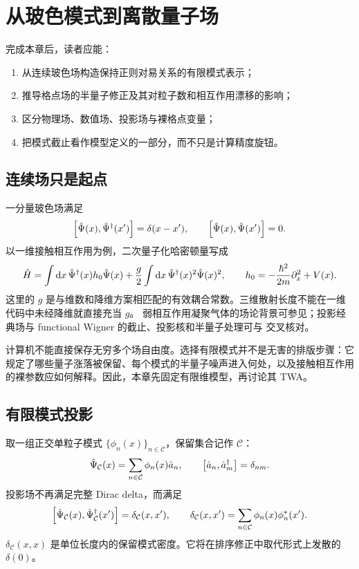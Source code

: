 \chapter{从玻色模式到离散量子场}
\label{ch:bose-field}

\begin{learningobjectives}
完成本章后，读者应能：
\begin{enumerate}
  \item 从连续玻色场构造保持正则对易关系的有限模式表示；
  \item 推导格点场的半量子修正及其对粒子数和相互作用漂移的影响；
  \item 区分物理场、数值场、投影场与裸格点变量；
  \item 把模式截止看作模型定义的一部分，而不只是计算精度旋钮。
\end{enumerate}
\end{learningobjectives}

\section{连续场只是起点}

一分量玻色场满足
\begin{equation}
  \left[\hat{\Psi}(x),\hat{\Psi}^{\dagger}(x')\right]=\delta(x-x'),
  \qquad
  \left[\hat{\Psi}(x),\hat{\Psi}(x')\right]=0 .
  \label{eq:continuous-commutator}
\end{equation}
以一维接触相互作用为例，二次量子化哈密顿量写成
\begin{equation}
  \hat H=\int\mathop{}\!\mathrm{d} x\,\hat{\Psi}^{\dagger}(x)h_0\hat{\Psi}(x)
  +\frac{g}{2}\int\mathop{}\!\mathrm{d} x\,\hat{\Psi}^{\dagger}(x)^2\hat{\Psi}(x)^2,
  \qquad
  h_0=-\frac{\hbar^2}{2m}\partial_x^2+V(x).
  \label{eq:continuum-bose-hamiltonian}
\end{equation}
这里的 $g$ 是与维数和降维方案相匹配的有效耦合常数。三维散射长度不能在一维代码中未经降维就直接充当 $g$。
弱相互作用凝聚气体的场论背景可参见\cite{Dalfovo1999}；投影经典场与
functional Wigner 的截止、投影核和半量子处理可与
\cite{Blakie2008,Opanchuk2013}交叉核对。

计算机不能直接保存无穷多个场自由度。选择有限模式并不是无害的排版步骤：它规定了哪些量子涨落被保留、每个模式的半量子噪声进入何处，以及接触相互作用的裸参数应如何解释。因此，本章先固定有限维模型，再讨论其 TWA。

\section{有限模式投影}

取一组正交单粒子模式 $\{\phi_n(x)\}_{n\in\mathcal C}$，保留集合记作 $\mathcal C$：
\begin{equation}
  \hat{\Psi}_{\mathcal C}(x)=\sum_{n\in\mathcal C}\phi_n(x)\hat a_n,
  \qquad
  \left[\hat a_n,\hat a^{\dagger}_m\right]=\delta_{nm}.
  \label{eq:projected-field}
\end{equation}
投影场不再满足完整 Dirac delta，而满足
\begin{equation}
  \left[\hat{\Psi}_{\mathcal C}(x),\hat{\Psi}^{\dagger}_{\mathcal C}(x')\right]
  =\delta_{\mathcal C}(x,x'),
  \qquad
  \delta_{\mathcal C}(x,x')
  =\sum_{n\in\mathcal C}\phi_n(x)\phi_n^*(x').
  \label{eq:projected-delta}
\end{equation}
$\delta_{\mathcal C}(x,x)$ 是单位长度内的保留模式密度。它将在排序修正中取代形式上发散的 $\delta(0)$。

